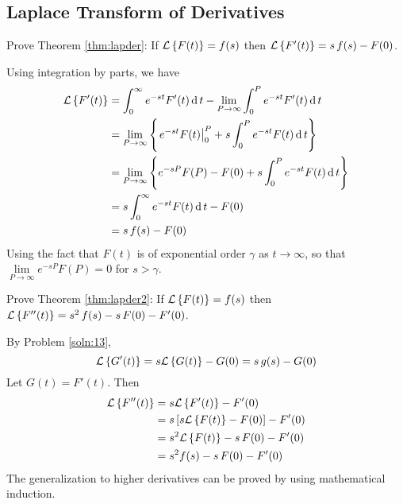 \documentclass[../main-sheet.tex]{subfiles}
\begin{document}
\subsection{Laplace Transform of Derivatives}
\begin{prob}
    Prove Theorem \ref{thm:lapder}: If $ \mathcal{L}\left\{ F(t)\right\}=f(s) $ then $ \mathcal{L}\left\{ F'(t)\right\}=s\,f(s)-F(0) $.
\end{prob}
\begin{soln}\label{soln:13}
    Using integration by parts, we have
    \begin{align*}
        \mathcal{L}\left\{ F'(t)\right\}&=\int_0^\infty e^{-st}F'(t)\,\mathrm{d}\, t-\lim\limits_{P\to \infty}\int_0^P e^{-st}F'(t)\,\mathrm{d}\, t\\
        &=\lim\limits_{P\to \infty}\left\{ \left.e^{-st}F(t)\right\vert_0^P +s\int_0^P e^{-st}F(t)\,\mathrm{d}\, t \right\}\\
        &=\lim\limits_{P\to \infty}\left\{ e^{-sP}F(P)-F(0) +s\int_0^P e^{-st}F(t)\,\mathrm{d}\, t \right\}\\
        &=s\int_0^\infty e^{-st}F(t)\,\mathrm{d}\, t-F(0)\\
        &=s\,f(s)-F(0)
    \end{align*}
    Using the fact that $ F(t) $ is of exponential order $ \gamma $ as $ t \to \infty $, so that $ \lim\limits_{P\to\infty} e^{-sP}F(P)=0$ for $ s>\gamma $.
\end{soln}
\begin{prob}
    Prove Theorem \ref{thm:lapder2}: If $ \mathcal{L}\left\{ F(t)\right\}=f(s) $ then $ \mathcal{L}\left\{ F''(t)\right\}=s^2\,f(s)-s\,F(0)-F'(0) $.
\end{prob}
\begin{soln}
    By Problem \ref{soln:13},
    \[
        \mathcal{L}\left\{ G'(t)\right\}=s\mathcal{L}\left\{ G(t)\right\}-G(0)=s\,g(s)-G(0)
    \]
    Let $ G(t)=F'(t) $. Then 
    \begin{align*}
        \mathcal{L}\left\{ F''(t)\right\}&=s\mathcal{L}\left\{ F'(t)\right\}-F'(0)\\
        &=s\left[ s\mathcal{L}\left\{ F(t)\right\}-F(0) \right]-F'(0)\\
        &=s^2 \mathcal{L}\left\{ F(t)\right\}-s\,F(0) -F'(0)\\
        &=s^2 f(s)-s\,F(0) -F'(0)
    \end{align*}
    The generalization to higher derivatives can be proved by using mathematical induction.
\end{soln}
\end{document}
